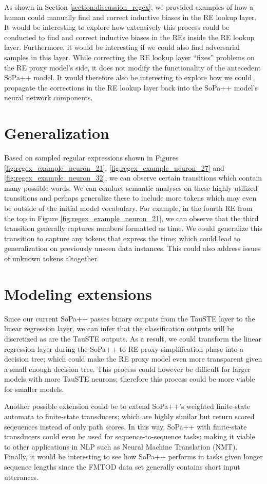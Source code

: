 As shown in Section \ref{section:discussion_regex}, we provided examples of how
a human could manually find and correct inductive biases in the RE lookup layer.
It would be interesting to explore how extensively this process could be
conducted to find and correct inductive biases in the REs inside the RE lookup
layer. Furthermore, it would be interesting if we could also find adversarial
samples in this layer. While correcting the RE lookup layer ``fixes'' problems
on the RE proxy model's side, it does not modify the functionality of the
antecedent SoPa++ model. It would therefore also be interesting to explore how
we could propagate the corrections in the RE lookup layer back into the SoPa++
model's neural network components.

\section{Generalization}

Based on sampled regular expressions shown in Figures
\ref{fig:regex_example_neuron_21}, \ref{fig:regex_example_neuron_27} and
\ref{fig:regex_example_neuron_32}, we can observe certain transitions which
contain many possible words. We can conduct semantic analyses on these highly
utilized transitions and perhaps generalize these to include more tokens which
may even be outside of the initial model vocabulary. For example, in the fourth
RE from the top in Figure \ref{fig:regex_example_neuron_21}, we can observe that
the third transition generally captures numbers formatted as time. We could
generalize this transition to capture any tokens that express the time; which
could lead to generalization on previously unseen data instances. This could
also address issues of unknown tokens altogether. 

\section{Modeling extensions}

Since our current SoPa++ passes binary outputs from the TauSTE layer to the
linear regression layer, we can infer that the classification outputs will be
discretized as are the TauSTE outputs. As a result, we could transform the
linear regression layer during the SoPa++ to RE proxy simplification phase into
a decision tree; which could make the RE proxy model even more transparent given
a small enough decision tree. This process could however be difficult for larger
models with more TauSTE neurons; therefore this process could be more viable for
smaller models.

Another possible extension could be to extend SoPa++'s weighted finite-state
automata to finite-state transducers; which are highly similar but return scored
seqeuences instead of only path scores. In this way, SoPa++ with finite-state
transducers could even be used for sequence-to-sequence tasks; making it viable
to other applications in NLP such as Neural Machine Translation (NMT). Finally,
it would be interesting to see how SoPa++ performs in tasks given longer
sequence lengths since the FMTOD data set generally contains short input
utterances.

